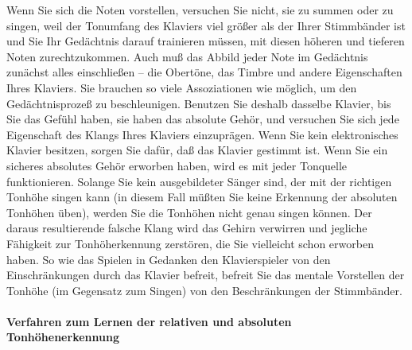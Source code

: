 Wenn Sie sich die Noten vorstellen, versuchen Sie nicht, sie zu summen oder zu singen, weil der Tonumfang des Klaviers viel größer als der Ihrer Stimmbänder ist und Sie Ihr Gedächtnis darauf trainieren müssen, mit diesen höheren und tieferen Noten zurechtzukommen.
Auch muß das Abbild jeder Note im Gedächtnis zunächst alles einschließen -- die Obertöne, das Timbre und andere Eigenschaften Ihres Klaviers.
Sie brauchen so viele Assoziationen wie möglich, um den Gedächtnisprozeß zu beschleunigen.
Benutzen Sie deshalb dasselbe Klavier, bis Sie das Gefühl haben, sie haben das absolute Gehör, und versuchen Sie sich jede Eigenschaft des Klangs Ihres Klaviers einzuprägen.
Wenn Sie kein elektronisches Klavier besitzen, sorgen Sie dafür, daß das Klavier gestimmt ist.
Wenn Sie ein sicheres absolutes Gehör erworben haben, wird es mit jeder Tonquelle funktionieren.
Solange Sie kein ausgebildeter Sänger sind, der mit der richtigen Tonhöhe singen kann (in diesem Fall müßten Sie keine Erkennung der absoluten Tonhöhen üben), werden Sie die Tonhöhen nicht genau singen können.
Der daraus resultierende falsche Klang wird das Gehirn verwirren und jegliche Fähigkeit zur Tonhöherkennung zerstören, die Sie vielleicht schon erworben haben.
So wie das Spielen in Gedanken den Klavierspieler von den Einschränkungen durch das Klavier befreit, befreit Sie das mentale Vorstellen der Tonhöhe (im Gegensatz zum Singen) von den Beschränkungen der Stimmbänder.


\paragraph{Verfahren zum Lernen der relativen und absoluten Tonhöhenerkennung}
\label{c1iii12tonhoehe}

